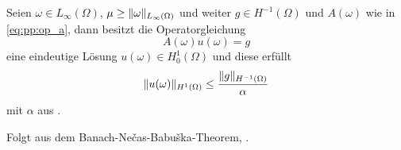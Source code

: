 

\begin{Satz}
\label{satz:pp:lax_auf_elliptisch}
    Seien $\omega \in L_{\infty}(\Omega)$, $\mu \geq \lVert\omega\rVert_{L_{\infty}(\Omega)}$ und weiter $g \in H^{-1}(\Omega)$ und $A(\omega)$ wie in \eqref{eq:pp:op_a}, dann besitzt die Operatorgleichung
    \begin{equation}
        A(\omega) u(\omega) = g
    \end{equation}
    eine eindeutige Lösung $u(\omega) \in H^{1}_{0}(\Omega)$ und diese erfüllt
    \begin{equation}
        \lVert u(\omega)\rVert_{H^{1}(\Omega)} \leq \frac{\lVert g\rVert_{H^{-1}(\Omega)}}{\alpha}
    \end{equation}
    mit $\alpha$ aus .

    \begin{Beweis}
        Folgt aus dem Banach-Ne\v{c}as-Babu\v{s}ka-Theorem, .
    \end{Beweis}
\end{Satz}


